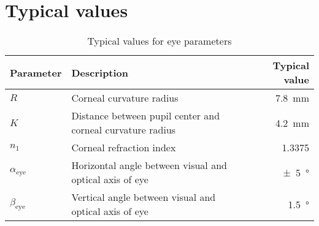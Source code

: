 \documentclass[a4paper, 12pt]{article}
\begin{document}
\section{Typical values}

\begin{table}[h!]
    \centering
    \caption{Typical values for eye parameters}
    \begin{tabularx}{\textwidth}{l X r}
        \toprule
        Parameter             & Description                                                & Typical value       \\
        \midrule
        $R$                   & Corneal curvature radius                                   & \SI{7.8}{\mm}       \\
        $K$                   & Distance between pupil center and corneal curvature radius & \SI{4.2}{\mm}       \\
        $n_1$                 & Corneal refraction index                                   & \num{1.3375}        \\
        $\alpha_{\text{eye}}$ & Horizontal angle between visual and optical axis of eye    & \SI{\pm 5}{\degree} \\
        $\beta_{\text{eye}}$  & Vertical angle between visual and optical axis of eye      & \SI{1.5}{\degree}   \\
        \bottomrule
    \end{tabularx}
\end{table}
\end{document}
